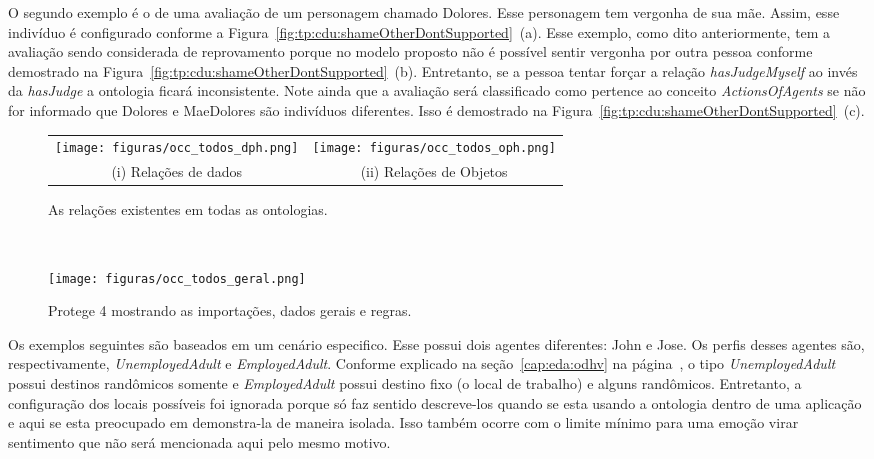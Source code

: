 O segundo exemplo é o de uma avaliação de um personagem chamado Dolores. Esse
personagem tem vergonha de sua mãe. Assim, esse indivíduo é configurado
conforme a Figura~\ref{fig:tp:cdu:shameOtherDontSupported}~(a).
Esse exemplo, como dito anteriormente, tem a avaliação sendo considerada de
reprovamento porque no modelo proposto não é possível sentir vergonha por
outra pessoa conforme demostrado na
Figura~\ref{fig:tp:cdu:shameOtherDontSupported}~(b). Entretanto, se a pessoa
tentar forçar a relação \emph{hasJudgeMyself} ao invés da \emph{hasJudge} a
ontologia ficará inconsistente. Note ainda que a avaliação será classificado
como pertence ao conceito \emph{ActionsOfAgents} se não for informado que
Dolores e MaeDolores são indivíduos diferentes. Isso é demostrado na
Figura~\ref{fig:tp:cdu:shameOtherDontSupported}~(c).

\begin{figure}[ht]
    \centering
	\begin{minipage}[t]{\linewidth}
		\centering
	    \begin{tabular}{cc}
		\texttt{[image: figuras/occ\_todos\_dph.png]} \hspace{1cm} & \texttt{[image: figuras/occ\_todos\_oph.png]} \\
	    (i) Relações de dados & (ii) Relações de Objetos
	    \end{tabular}
		\caption{As relações existentes em todas as ontologias.}
		\label{fig:tp:cdu:relations}
	\end{minipage} \vspace{0.3cm} \\
	\begin{minipage}[b]{\linewidth}
		\centering
		\texttt{[image: figuras/occ\_todos\_geral.png]}
		\caption{Protege 4 mostrando as importações, dados gerais e regras.}
		\label{fig:tp:cdu:geral}
	\end{minipage}
\end{figure}

Os exemplos seguintes são baseados em um cenário especifico. Esse possui
dois agentes diferentes: John e Jose. Os perfis desses agentes
são, respectivamente, \emph{UnemployedAdult} e \emph{EmployedAdult}.
Conforme explicado na seção~\ref{cap:eda:odhv} na página~\pageref{ex:tipos},
o tipo \emph{UnemployedAdult} possui destinos randômicos somente e
\emph{EmployedAdult} possui destino fixo (o local de trabalho) e alguns
randômicos. Entretanto, a configuração dos locais possíveis foi ignorada
porque só faz sentido descreve-los quando se esta usando a ontologia
dentro de uma aplicação e aqui se esta preocupado em demonstra-la de maneira
isolada. Isso também ocorre com o limite mínimo para uma emoção virar
sentimento que não será mencionada aqui pelo mesmo motivo.

